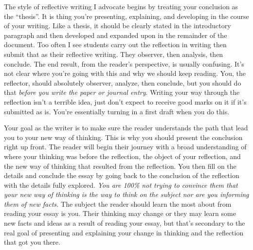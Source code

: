 \documentclass[]{article}
\begin{document}
The style of reflective writing I advocate begins by treating your conclusion as the ``thesis''. It is thing you're presenting, explaining, and developing in the course of your writing. Like a thesis, it should be clearly stated in the introductory paragraph and then developed and expanded upon in the remainder of the document. Too often I see students carry out the reflection in writing then submit that as their reflective writing.  They observer, then analysis, then conclude.  The end result, from the reader's perspective, is usually confusing. It's not clear where you're going with this and why we should keep reading. You, the reflector, should absolutely observer, analyze, then conclude, but you should do that \textit{before you write the paper or journal entry}.  Writing your way through the reflection isn't a terrible idea, just don't expect to receive good marks on it if it's submitted as is. You're essentially turning in a first draft when you do this. 

Your goal as the writer is to make sure the reader understands the path that lead you to your new way of thinking. This is why you should present the conclusion right up front. The reader will begin their journey with a broad understanding of  where your thinking was before the reflection, the object of your reflection, and the new way of thinking that resulted from the reflection. You then fill on the details and conclude the essay by going back to the conclusion of the reflection with the details fully explored. \textit{You are 100\% not trying to convince them that your new way of thinking is \textit{the} way to think on the subject nor are you informing them of new facts.} The subject the reader should learn the most about from reading your essay is you. Their thinking may change or they may learn some new facts and ideas as a result of reading your essay, but that's secondary to the real goal of presenting and explaining your change in thinking and the reflection that got you there. 
\end{document}
